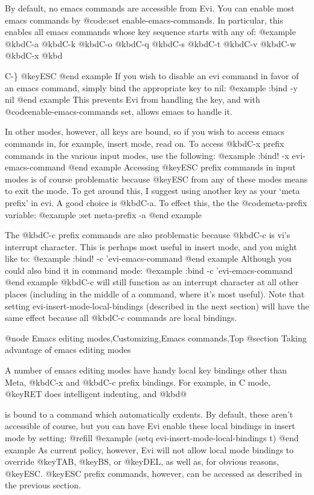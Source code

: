 By default, no emacs commands are accessible from Evi.  You can enable
most emacs commands by @code{:set enable-emacs-commands}.  In particular,
this enables all emacs commands whose key sequence starts with any of:
@example
@kbd{C-a} @kbd{C-k} @kbd{C-o} @kbd{C-q} @kbd{C-s} @kbd{C-t}
@kbd{C-v} @kbd{C-w} @kbd{C-x} @kbd{C-\} @key{ESC}
@end example
If you wish to disable an evi command in favor of an emacs command, simply
bind the appropriate key to nil:
@example
:bind \C-y nil
@end example
This prevents Evi from handling the key, and with @code{enable-emacs-commands}
set, allows emacs to handle it.

In other modes, however, all keys are bound, so if you wish to access emacs
commands in, for example, insert mode, read on.  To access @kbd{C-x} prefix
commands in the various input modes, use the following:
@example
:bind! \C-x evi-emacs-command
@end example
Accessing @key{ESC} prefix commands in input modes is of course problematic
because @key{ESC} from any of these modes means to exit the mode.  To get
around this, I suggest using another key as your `meta prefix' in evi.
A good choice is @kbd{C-a}.  To effect this, the the @code{meta-prefix}
variable:
@example
:set meta-prefix \C-a
@end example

The @kbd{C-c} prefix commands are also problematic because @kbd{C-c} is vi's
interrupt character.  This is perhaps most useful in insert mode, and you
might like to:
@example
:bind! \C-c 'evi-emacs-command
@end example
Although you could also bind it in command mode:
@example
:bind \C-c 'evi-emacs-command
@end example
@kbd{C-c} will still function as an interrupt character at all other places
(including in the middle of a command, where it's most useful).
Note that setting evi-insert-mode-local-bindings (described in the next
section) will have the same effect because all @kbd{C-c} commands are local
bindings.

@node Emacs editing modes,Customizing,Emacs commands,Top
@section Taking advantage of emacs editing modes

A number of emacs editing modes have handy local key bindings other than
Meta, @kbd{C-x} and @kbd{C-c} prefix bindings.
For example, in C mode, @key{RET} does
intelligent indenting, and @kbd{@}} is bound to a command which automatically
exdents.  By default, these aren't accessible of course, but you can
have Evi enable these local bindings in insert mode by setting: @refill
@example
(setq evi-insert-mode-local-bindings t)
@end example
As current policy, however, Evi will not allow local mode bindings to
override @key{TAB}, @key{BS}, or @key{DEL}, as well as, for obvious reasons, @key{ESC}.
@key{ESC} prefix commands, however, can be accessed as described in the
previous section.

